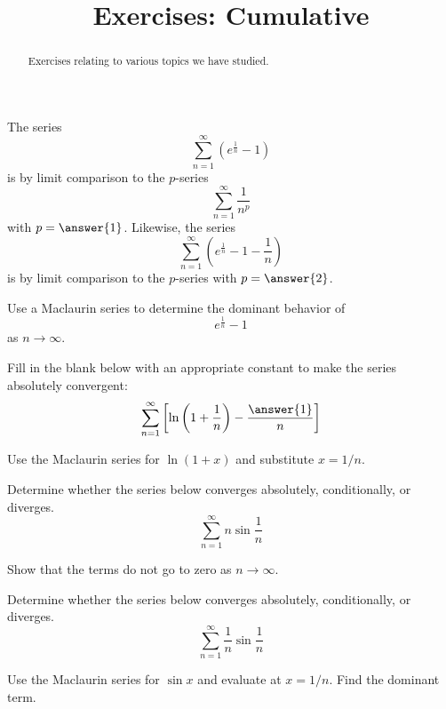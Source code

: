 \documentclass{ximera}
\title{Exercises: Cumulative}
\begin{document}
\begin{abstract}
Exercises relating to various topics we have studied.
\end{abstract}
\maketitle


\begin{exercise}
The series
\[ \sum_{n=1}^\infty \left( e^{ \frac{1}{n}} - 1 \right) \]
is  by limit comparison to the $p$-series
\[ \sum_{n=1}^\infty \frac{1}{n^p} \]
with $p = \answer{1}$.  Likewise, the
series
\[ \sum_{n=1}^\infty \left( e^{ \frac{1}{n}} - 1 - \frac{1}{n} \right) \]
is  by limit comparison to the $p$-series
with $p = \answer{2}$.
\begin{hint}
Use a Maclaurin series to determine the dominant behavior of 
\[ e^{\frac{1}{n}} - 1 \]
as $n \rightarrow \infty$.
\end{hint}
\end{exercise}

\begin{exercise}
Fill in the blank below with an appropriate constant to make the series absolutely convergent:
\[ \sum_{n=1}^\infty \left[ \ln \left( 1 + \frac{1}{n} \right) - \frac{\answer{1}}{n} \right] \]
\begin{hint}
Use the Maclaurin series for $\ln (1 + x)$ and substitute $x = 1/n$.
\end{hint}
\end{exercise}

\begin{exercise}
Determine whether the series below converges absolutely, conditionally, or diverges.
\[ \sum_{n=1}^\infty n \sin \frac{1}{n} \]
\begin{multipleChoice}
\end{multipleChoice}
\begin{hint}
Show that the terms do not go to zero as $n \rightarrow \infty$.
\end{hint}
\end{exercise}

\begin{exercise}
Determine whether the series below converges absolutely, conditionally, or diverges.
\[ \sum_{n=1}^\infty \frac{1}{n} \sin \frac{1}{n} \]
\begin{multipleChoice}
\end{multipleChoice}
\begin{hint}
Use the Maclaurin series for $\sin x$ and evaluate at $x = 1/n$. Find the dominant term.
\end{hint}
\end{exercise}
\end{document}
